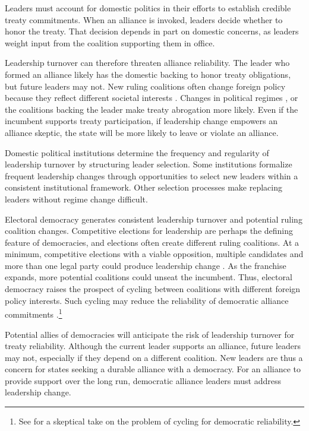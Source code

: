 \documentclass[12pt]{article}
\begin{document}
Leaders must account for domestic politics in their efforts to establish credible treaty commitments.
When an alliance is invoked, leaders decide whether to honor the treaty. 
That decision depends in part on domestic concerns, as leaders weight input from the coalition supporting them in office. 


Leadership turnover can therefore threaten alliance reliability.
The leader who formed an alliance likely has the domestic backing to honor treaty obligations, but future leaders may not. 
New ruling coalitions often change foreign policy because they reflect different societal interests \citep{Lobell2004, Narizny2007, Mattesetal2016}.  
Changes in political regimes \citep{LeedsSavun2007}, or the coalitions backing the leader \citep{Leedsetal2009} make treaty abrogation more likely. 
Even if the incumbent supports treaty participation, if leadership change empowers an alliance skeptic, the state will be more likely to leave or violate an alliance.  


Domestic political institutions determine the frequency and regularity of leadership turnover by structuring leader selection. 
Some institutions formalize frequent leadership changes through opportunities to select new leaders within a consistent institutional framework. 
Other selection processes make replacing leaders without regime change difficult. 


Electoral democracy generates consistent leadership turnover and potential ruling coalition changes. 
Competitive elections for leadership are perhaps the defining feature of democracies, and elections often create different ruling coalitions. 
At a minimum, competitive elections with a viable opposition, multiple candidates and more than one legal party could produce leadership change \citep{HydeMarinov2012}. 
As the franchise expands, more potential coalitions could unseat the incumbent.  
Thus, electoral democracy raises the prospect of cycling between coalitions with different foreign policy interests. 
Such cycling may reduce the reliability of democratic alliance commitments \citep{GartzkeGleditsch2004}.\footnote{See \citet{Gaubatz1996} for a skeptical take on the problem of cycling for democratic reliability.}


Potential allies of democracies will anticipate the risk of leadership turnover for treaty reliability. 
Although the current leader supports an alliance, future leaders may not, especially if they depend on a different coalition. 
New leaders are thus a concern for states seeking a durable alliance with a democracy. 
For an alliance to provide support over the long run, democratic alliance leaders must address leadership change.
\end{document}
